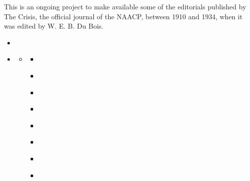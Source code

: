 \documentclass[letterpaper,10pt,english]{jupyterBook}
\title{Dare you Fight&#58;<br/>W.E.B. Du Bois in The Crisis}
\date{Apr 13, 2022}
\author{William E.\@{} Burghardt Du Bois}
\begin{document}
\pagestyle{empty}
\sphinxmaketitle
\pagestyle{plain}
\sphinxtableofcontents
\pagestyle{normal}
\label{\detokenize{index::doc}}


\sphinxAtStartPar
This is an ongoing project to make available some of the editorials published by The Crisis, the official journal of the NAACP, between 1910 and 1934, when it was edited by W. E. B. Du Bois.
\begin{itemize}
\item {} 
\sphinxAtStartPar
{\hyperref[\detokenize{introduction::doc}]{}}

\item {} 
\sphinxAtStartPar
{\hyperref[\detokenize{Sections/socialchange::doc}]{}}
\begin{itemize}
\item {} 
\sphinxAtStartPar
{\hyperref[\detokenize{Sections/protest::doc}]{}}
\begin{itemize}
\item {} 
\sphinxAtStartPar
{\hyperref[\detokenize{Volumes/01/01/Agitation::doc}]{}}

\item {} 
\sphinxAtStartPar
{\hyperref[\detokenize{Volumes/05/05/proper_way::doc}]{}}

\item {} 
\sphinxAtStartPar
{\hyperref[\detokenize{Volumes/16/03/close_ranks::doc}]{}}

\item {} 
\sphinxAtStartPar
{\hyperref[\detokenize{Volumes/19/01/statement::doc}]{}}

\item {} 
\sphinxAtStartPar
{\hyperref[\detokenize{Volumes/12/06/negro_party::doc}]{}}

\item {} 
\sphinxAtStartPar
{\hyperref[\detokenize{Volumes/22/01/inter-racial_comity::doc}]{}}

\item {} 
\sphinxAtStartPar
{\hyperref[\detokenize{Volumes/24/01/publicity::doc}]{}}

\item {} 
\sphinxAtStartPar
{\hyperref[\detokenize{Volumes/41/05/violence::doc}]{}}


\end{itemize}
\end{itemize}
\end{itemize}
\end{document}
